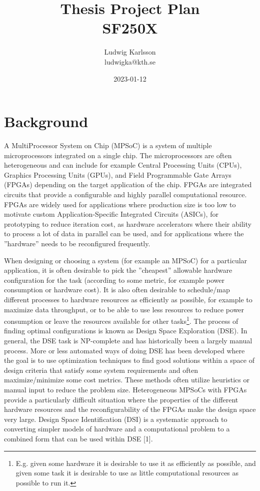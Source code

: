 \documentclass[12pt,notitlepage]{article}
\title{Thesis Project Plan\\SF250X}
\author{Ludwig Karlsson\\ludwigka@kth.se}
\date{2023-01-12}
\begin{document}
\maketitle

\section{Background}
A MultiProcessor System on Chip (MPSoC) is a system of multiple microprocessors integrated on a single chip. The microprocessors are often heterogeneous and can include for example Central Processing Units (CPUs), Graphics Processing Units (GPUs), and Field Programmable Gate Arrays (FPGAs) depending on the target application of the chip. FPGAs are integrated circuits that provide a configurable and highly parallel computational resource. FPGAs are widely used for applications where production size is too low to motivate custom Application-Specific Integrated Circuits (ASICs), for prototyping to reduce iteration cost, as hardware accelerators where their ability to process a lot of data in parallel can be used, and for applications where the ''hardware'' needs to be reconfigured frequently.

When designing or choosing a system (for example an MPSoC) for a particular application, it is often desirable to pick the ''cheapest'' allowable hardware configuration for the task (according to some metric, for example power consumption or hardware cost). It is also often desirable to schedule/map different processes to hardware resources as efficiently as possible, for example to maximize data throughput, or to be able to use less resources to reduce power consumption or leave the resources available for other tasks\footnote{E.g. given some hardware it is desirable to use it as efficiently as possible, and given some task it is desirable to use as little computational resources as possible to run it.}. The process of finding optimal configurations is known as Design Space Exploration (DSE). In general, the DSE task is NP-complete and has historically been a largely manual process. More or less automated ways of doing DSE has been developed where the goal is to use optimization techniques to find good solutions within a space of design criteria that satisfy some system requirements and often maximize/minimize some cost metrics. These methods often utilize heuristics or manual input to reduce the problem size. Heterogeneous MPSoCs with FPGAs provide a particularly difficult situation where the properties of the different hardware resources and the reconfigurability of the FPGAs make the design space very large. Design Space Identification (DSI) is a systematic approach to converting simpler models of hardware and a computational problem to a combined form that can be used within DSE [1].
\end{document}
